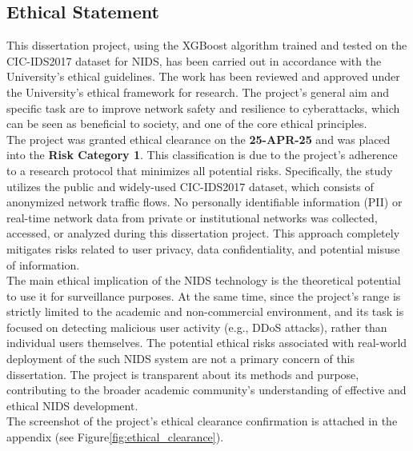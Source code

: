 \subsection{Ethical Statement}

This dissertation project, using the XGBoost algorithm trained and tested on the CIC-IDS2017 dataset for NIDS, 
has been carried out in accordance with the University's ethical guidelines. The work has been reviewed and approved under 
the University's ethical framework for research. The project's general aim and specific task are to improve network safety and 
resilience to cyberattacks, which can be seen as beneficial to society, and one of the core ethical principles.\\

\noindent The project was granted ethical clearance on the \textbf{25-APR-25} and was placed into the \textbf{Risk Category 1}. This 
classification is due to the project's adherence to a research protocol that minimizes all potential risks. Specifically, 
the study utilizes the public and widely-used CIC-IDS2017 dataset, which consists of anonymized network traffic flows. No
personally identifiable information (PII) or real-time network data from private or institutional networks was collected, 
accessed, or analyzed during this dissertation project. This approach completely mitigates risks related to user privacy, 
data confidentiality, and potential misuse of information.\\

\noindent The main ethical implication of the NIDS technology is the theoretical potential to use it for surveillance purposes. At the same 
time, since the project's range is strictly limited to the academic and non-commercial environment, and its task is focused on 
detecting malicious user activity (e.g., DDoS attacks), rather than individual users themselves. The potential ethical risks 
associated with real-world deployment of the such NIDS system are not a primary concern of this dissertation. The project is 
transparent about its methods and purpose, contributing to the broader academic community's understanding of effective and 
ethical NIDS development.\\

\noindent The screenshot of the project's ethical clearance confirmation is attached in the appendix (see Figure\ref{fig:ethical_clearance}).